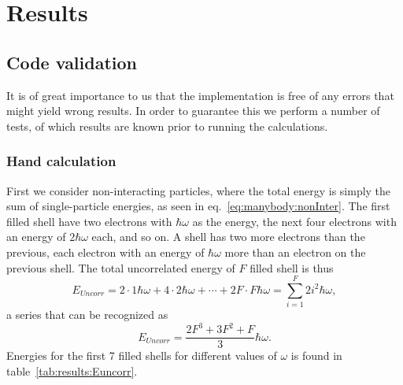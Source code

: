 \chapter{Results}

\section{Code validation}
It is of great importance to us that the implementation is free of any errors that might yield wrong results.
In order to guarantee this we perform a number of tests, of which results are known prior to running the calculations.

\subsection{Hand calculation}
First we consider non-interacting particles, where the total energy is simply the sum of single-particle energies, as seen in eq.~\eqref{eq:manybody:nonInter}.
The first filled shell have two electrons with $\hbar \omega$ as the energy, the next four electrons with an energy of $2\hbar \omega$ each, and so on.
A shell has two more electrons than the previous, each electron with an energy of $\hbar \omega$ more than an electron on the previous shell.
The total uncorrelated energy of $F$ filled shell is thus
\begin{equation}
E_{Uncorr} = 
2 \cdot 1\hbar \omega 
+ 
4 \cdot 2\hbar \omega 
+
\cdots
+
2F \cdot F\hbar \omega
=
\sum_{i=1}^F 2 i^2 \hbar\omega , 
\end{equation}
a series that can be recognized as 
\begin{equation}
E_{Uncorr} = \frac{2F^3 + 3F^2 + F}{3} \hbar \omega .
\end{equation}
Energies for the first 7 filled shells for different values of $\omega$ is found in table~\ref{tab:results:Euncorr}.
